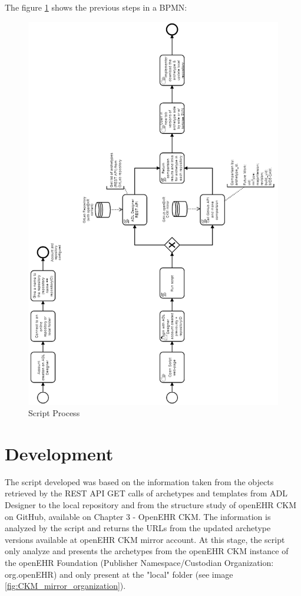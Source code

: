 \documentclass[mim_thesis.tex]{subfiles}
\begin{document}
 The figure \ref{fig:script_process} shows the previous steps in a \ac{BPMN}:
 
\begin{figure}[H]
	\centering
    \includegraphics[width=1.07\textwidth]{img/script_process.PNG}
	\caption{Script Process}
	\label{fig:script_process}
\end{figure}

\section{Development}
The script developed was based on the information taken from the objects retrieved by the REST API GET calls of archetypes and templates from ADL Designer to the local repository and from the structure study of openEHR CKM on GitHub, available on Chapter 3 - OpenEHR CKM. The information is analyzed by the script and returns the URLs from the updated archetype versions available at openEHR CKM mirror account. At this stage, the script only analyze and presents the archetypes from the openEHR CKM instance of the openEHR Foundation (Publisher Namespace/Custodian Organization: org.openEHR) and only present at the "local" folder (see image \ref{fig:CKM_mirror_organization}).
\end{document}
